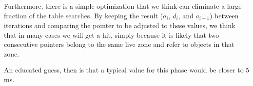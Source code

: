 Furthermore, there is a simple optimization that we think can
eliminate a large fraction of the table searches.  By keeping the
result ($a_i$, $d_i$, and $a_{i+1}$) between iterations and comparing
the pointer to be adjusted to these values, we think that in many
cases we will get a hit, simply because it is likely that two
consecutive pointers belong to the same live zone and refer to objects
in that zone.  

An educated guess, then is that a typical value for this phase would
be closer to $5$ms. 

